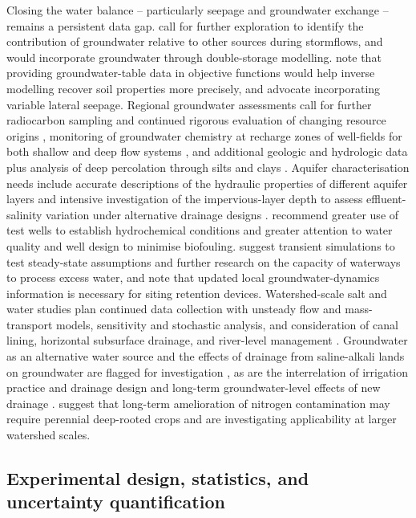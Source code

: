 \documentclass[11pt]{article}
\begin{document}
Closing the water balance -- particularly seepage and groundwater exchange --
remains a persistent data gap. \textcite{Grose2022} call for further exploration
to identify the contribution of groundwater relative to other sources during
stormflows, and \textcite{DaneshYazdi2016} would incorporate groundwater through
double-storage modelling. \textcite{Sedaghatdoost2018} note that providing
groundwater-table data in objective functions would help inverse modelling recover
soil properties more precisely, and \textcite{Feng2018} advocate incorporating
variable lateral seepage. Regional groundwater assessments call for further
radiocarbon sampling and continued rigorous evaluation of changing resource origins
\parencite{Tweed2018}, monitoring of groundwater chemistry at recharge zones of
well-fields for both shallow and deep flow systems \parencite{Dragon2016}, and
additional geologic and hydrologic data plus analysis of deep percolation through
silts and clays \parencite{BOOKMAN1959}. Aquifer characterisation needs include
accurate descriptions of the hydraulic properties of different aquifer layers
\parencite{KAMRA1991} and intensive investigation of the impervious-layer depth to
assess effluent-salinity variation under alternative drainage designs
\parencite{KAMRA1994}. \textcite{Stuetz2004} recommend greater use of test wells to
establish hydrochemical conditions and greater attention to water quality and well
design to minimise biofouling. \textcite{Schilling2022} suggest transient
simulations to test steady-state assumptions and further research on the capacity
of waterways to process excess water, and \textcite{Xu2022} note that updated local
groundwater-dynamics information is necessary for siting retention devices.
Watershed-scale salt and water studies plan continued data collection with
unsteady flow and mass-transport models, sensitivity and stochastic analysis, and
consideration of canal lining, horizontal subsurface drainage, and river-level
management \parencite{Gates2002,Burkhalter2006}. Groundwater as an alternative
water source and the effects of drainage from saline-alkali lands on groundwater
are flagged for investigation \parencite{Zheng2025b}, as are the interrelation of
irrigation practice and drainage design \parencite{Sinai2005} and long-term
groundwater-level effects of new drainage \parencite{Okuda2020}. \textcite{Keller2008}
suggest that long-term amelioration of nitrogen contamination may require perennial
deep-rooted crops and are investigating applicability at larger watershed scales.

\subsection{Experimental design, statistics, and uncertainty quantification}
\end{document}
